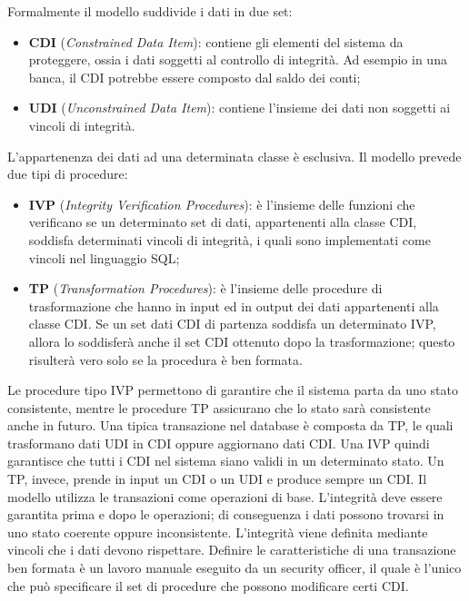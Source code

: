 Formalmente il modello suddivide i dati in due set:

\begin{itemize}
      \item \textbf{CDI} (\textit{Constrained Data Item}): contiene gli elementi
            del sistema da proteggere, ossia i dati
            soggetti al controllo di integrità. Ad esempio in una banca, il CDI
            potrebbe essere composto
            dal saldo dei conti;
      \item \textbf{UDI} (\textit{Unconstrained Data Item}): contiene l'insieme
            dei dati non soggetti ai vincoli di
            integrità.
\end{itemize}

L'appartenenza dei dati ad una determinata classe è esclusiva.
Il modello prevede due tipi di procedure:

\begin{itemize}
      \item \textbf{IVP} (\textit{Integrity Verification Procedures}): è
            l'insieme delle funzioni che verificano se un
            determinato set di dati, appartenenti alla classe CDI, soddisfa
            determinati vincoli di
            integrità, i quali sono implementati come vincoli nel linguaggio SQL;
      \item \textbf{TP} (\textit{Transformation Procedures}): è l'insieme delle
            procedure di trasformazione che hanno in input
            ed in output dei dati appartenenti alla classe CDI. Se un set dati
            CDI di partenza soddisfa
            un determinato IVP, allora lo soddisferà anche il set CDI ottenuto
            dopo la trasformazione;
            questo risulterà vero solo se la procedura è ben formata.
\end{itemize}

Le procedure tipo IVP permettono di garantire che il sistema parta da uno stato
consistente,
mentre le procedure TP assicurano che lo stato sarà consistente anche in futuro.
Una tipica
transazione nel database è composta da TP, le quali trasformano dati UDI in CDI
oppure
aggiornano dati CDI.
Una IVP quindi garantisce che tutti i CDI nel sistema siano validi in un
determinato stato. Un TP,
invece, prende in input un CDI o un UDI e produce sempre un CDI.
Il modello utilizza le transazioni come operazioni di base. L'integrità deve
essere garantita prima e
dopo le operazioni; di conseguenza i dati possono trovarsi in uno stato coerente
oppure
inconsistente. L'integrità viene definita mediante vincoli che i dati devono
rispettare.
Definire le caratteristiche di una transazione ben formata è un lavoro manuale
eseguito da un
security officer, il quale è l'unico che può specificare il set di procedure che
possono modificare
certi CDI.

